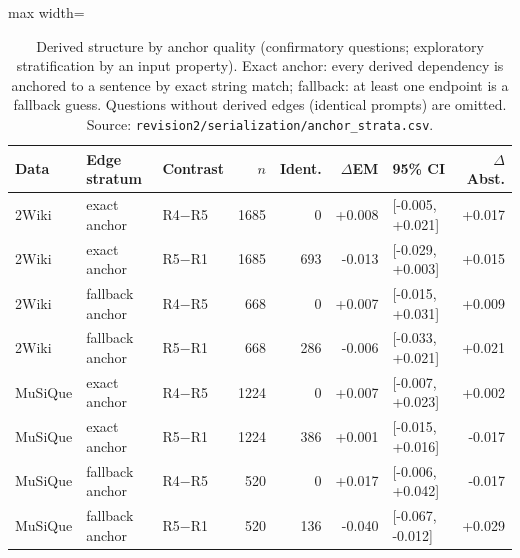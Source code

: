 \begin{table}[t]
\centering
\footnotesize
\begin{adjustbox}{max width=\linewidth}
\begin{tabular}{@{}lllrrrlr@{}}
\toprule
Data & Edge stratum & Contrast & $n$ & Ident. & $\Delta$EM & 95\% CI & $\Delta$Abst. \\
\midrule
2Wiki & exact anchor & R4$-$R5 & 1685 & 0 & +0.008 & [-0.005, +0.021] & +0.017 \\
2Wiki & exact anchor & R5$-$R1 & 1685 & 693 & -0.013 & [-0.029, +0.003] & +0.015 \\
2Wiki & fallback anchor & R4$-$R5 & 668 & 0 & +0.007 & [-0.015, +0.031] & +0.009 \\
2Wiki & fallback anchor & R5$-$R1 & 668 & 286 & -0.006 & [-0.033, +0.021] & +0.021 \\
MuSiQue & exact anchor & R4$-$R5 & 1224 & 0 & +0.007 & [-0.007, +0.023] & +0.002 \\
MuSiQue & exact anchor & R5$-$R1 & 1224 & 386 & +0.001 & [-0.015, +0.016] & -0.017 \\
MuSiQue & fallback anchor & R4$-$R5 & 520 & 0 & +0.017 & [-0.006, +0.042] & -0.017 \\
MuSiQue & fallback anchor & R5$-$R1 & 520 & 136 & -0.040 & [-0.067, -0.012] & +0.029 \\
\bottomrule
\end{tabular}
\end{adjustbox}
\caption{Derived structure by anchor quality (confirmatory questions; exploratory stratification by an input property). Exact anchor: every derived dependency is anchored to a sentence by exact string match; fallback: at least one endpoint is a fallback guess. Questions without derived edges (identical prompts) are omitted. Source: \texttt{revision2/\allowbreak serialization/\allowbreak anchor\_strata.csv}.}
\label{tab:anchor}
\end{table}
